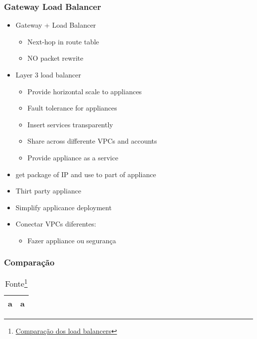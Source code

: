 \begin{frame}
	\frametitle{Gateway Load Balancer}
	\begin{itemize}
		\item Gateway + Load Balancer
			\begin{itemize}
				\item Next-hop in route table
				\item NO packet rewrite
			\end{itemize}
		\item Layer 3 load balancer
			\begin{itemize}
				\item Provide horizontal scale to appliances
				\item Fault tolerance for appliances
				\item Insert services transparently
				\item Share across differente VPCs and accounts
				\item Provide appliance as a service
			\end{itemize}
		\item get package of IP and use to part of appliance
		\item Thirt party appliance
		\item Simplify applicance deployment
		\item Conectar VPCs diferentes:
			\begin{itemize}
				\item Fazer appliance ou segurança
			\end{itemize}
	\end{itemize}
\end{frame}

\begin{frame}
	\frametitle{Comparação}
	\begin{table}[htpb]
		\centering
		\caption{Fonte\footnote{\href{https://aws.amazon.com/pt/elasticloadbalancing/features/\#Product_comparisons}{Comparação dos load balancers}}}
	
		\begin{tabular}{|c|c|}
			\hline
			a & a \\
			\hline \hline
		\end{tabular}
	\end{table}
\end{frame}
